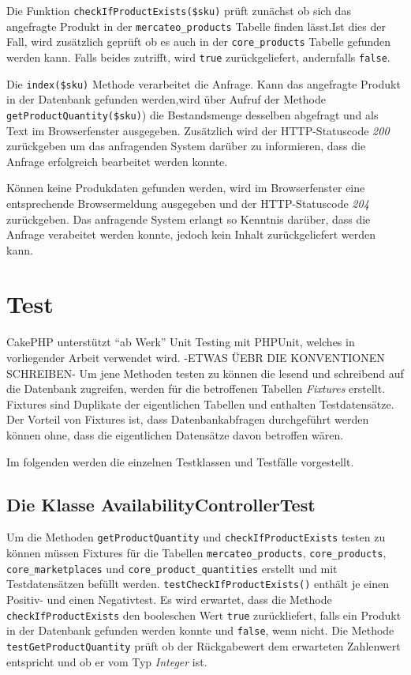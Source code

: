 	Die Funktion \texttt{checkIfProductExists(\$sku)} prüft zunächst ob sich das angefragte Produkt in der \texttt{mercateo\_products} Tabelle finden lässt.Ist dies der Fall, wird zusätzlich geprüft ob es auch in der \texttt{core\_products} Tabelle gefunden werden kann. Falls beides zutrifft, wird \texttt{true} zurückgeliefert, andernfalls \texttt{false}.
	
	Die \texttt{index(\$sku)} Methode verarbeitet die Anfrage. Kann das angefragte Produkt in der Datenbank gefunden werden,wird über Aufruf der Methode \texttt{getProductQuantity(\$sku)}) die Bestandsmenge desselben abgefragt und als Text im Browserfenster ausgegeben. Zusätzlich wird der HTTP-Statuscode \textit{200} zurückgeben um das anfragenden System darüber zu informieren, dass die Anfrage erfolgreich bearbeitet werden konnte.
	
	Können keine Produkdaten gefunden werden, wird im Browserfenster eine entsprechende Browsermeldung ausgegeben und der HTTP-Statuscode \textit{204} zurückgeben. Das anfragende System erlangt so Kenntnis darüber, dass die Anfrage verabeitet werden konnte, jedoch kein Inhalt zurückgeliefert werden kann.
	
	\section{Test}
	
	
	CakePHP unterstützt \enquote{ab Werk} Unit Testing mit PHPUnit, welches in vorliegender Arbeit verwendet wird. -ETWAS ÜEBR DIE KONVENTIONEN SCHREIBEN-  Um jene Methoden testen zu können die lesend und schreibend auf die Datenbank zugreifen, werden für die betroffenen Tabellen \textit{Fixtures} erstellt. Fixtures sind Duplikate der eigentlichen Tabellen und enthalten Testdatensätze. Der Vorteil von Fixtures ist, dass Datenbankabfragen durchgeführt werden können ohne, dass die eigentlichen Datensätze davon betroffen wären.
	
	Im folgenden werden die einzelnen Testklassen und Testfälle vorgestellt.
	
	\subsection{Die Klasse AvailabilityControllerTest}
	
	Um die Methoden \texttt{getProductQuantity} und \texttt{checkIfProductExists} testen zu können müssen Fixtures für die Tabellen \texttt{mercateo\_products}, \texttt{core\_products}, \texttt{core\_marketplaces} und \texttt{core\_product\_quantities} erstellt und mit Testdatensätzen befüllt werden.
	\texttt{testCheckIfProductExists()} enthält je einen Positiv- und einen Negativtest. Es wird erwartet, dass die Methode \texttt{checkIfProductExists} den booleschen Wert \texttt{true} zurückliefert, falls ein Produkt in der Datenbank gefunden werden konnte und \texttt{false}, wenn nicht.
	Die Methode \texttt{testGetProductQuantity} prüft ob der Rückgabewert dem erwarteten Zahlenwert entspricht und ob er vom Typ \textit{Integer} ist.
	
